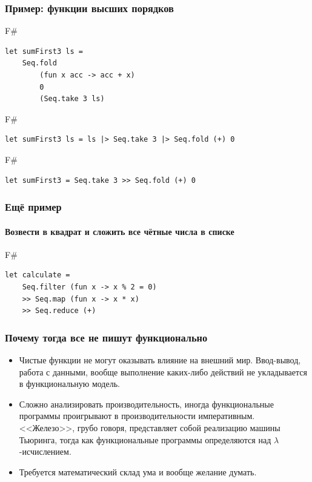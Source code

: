 \documentclass[xetex,mathserif,serif]{beamer}
\begin{document}
	\begin{frame}[fragile]
		\frametitle{Пример: функции высших порядков}
		\begin{exampleblock}{F\#}
			\begin{verbatim}
let sumFirst3 ls = 
    Seq.fold 
        (fun x acc -> acc + x) 
        0 
        (Seq.take 3 ls)
            \end{verbatim}
		\end{exampleblock}
		\begin{exampleblock}{F\#}
			\begin{verbatim}
let sumFirst3 ls = ls |> Seq.take 3 |> Seq.fold (+) 0
            \end{verbatim}
		\end{exampleblock}
		\begin{exampleblock}{F\#}
			\begin{verbatim}
let sumFirst3 = Seq.take 3 >> Seq.fold (+) 0
            \end{verbatim}
		\end{exampleblock}
\end{frame}

	\begin{frame}[fragile]
		\frametitle{Ещё пример}
		\framesubtitle{Возвести в квадрат и сложить все чётные числа в списке}
		\begin{exampleblock}{F\#}
			\begin{verbatim}
let calculate = 
    Seq.filter (fun x -> x % 2 = 0) 
    >> Seq.map (fun x -> x * x) 
    >> Seq.reduce (+)
            \end{verbatim}
		\end{exampleblock}
\end{frame}

	\begin{frame}
		\frametitle{Почему тогда все не пишут функционально}
		\begin{itemize}
			\item Чистые функции не могут оказывать влияние на внешний мир. Ввод-вывод, работа с данными,
					вообще выполнение каких-либо действий не укладывается в функциональную модель.
			\item Сложно анализировать производительность, иногда функциональные программы проигрывают
					в производительности императивным. <<Железо>>, грубо говоря, представляет собой 
					реализацию машины Тьюринга, тогда как функциональные программы определяются над
					$\lambda$-исчислением.
			\item Требуется математический склад ума и вообще желание думать.
		\end{itemize}
	\end{frame}
\end{document}
